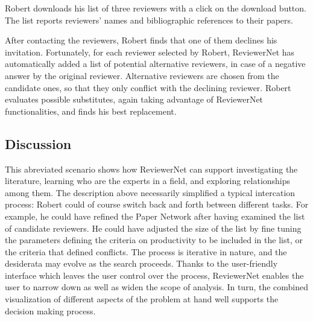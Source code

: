 Robert downloads his list of three reviewers with a click on the download button. The list reports reviewers' names and bibliographic references to their papers. 

After contacting the reviewers, Robert finds that one of them declines his invitation. Fortunately, for each reviewer selected by Robert, ReviewerNet has automatically added a list of potential alternative reviewers, in case of a negative answer by the original reviewer. Alternative reviewers are chosen from the candidate ones, so that they only conflict with the declining reviewer. Robert evaluates possible substitutes, again taking advantage of ReviewerNet functionalities, and finds his best replacement.  

\subsection{Discussion} 

This abreviated scenario shows how ReviewerNet can support investigating the literature, learning who are the experts in a field, and exploring relationships among them. The description above necessarily simplified a typical intercation process: Robert could of course switch back and forth between different tasks. For example, he could have refined the Paper Network after having examined the list of candidate reviewers. He could have adjusted the size of the list by fine tuning the parameters defining the criteria on productivity to be included in the list, or the criteria that defined conflicts. The process is iterative in nature, and the desiderata may evolve as the search proceeds. Thanks to the user-friendly interface which leaves the user control over the process, ReviewerNet enables the user to narrow down as well as widen the scope of analysis. In turn, the combined visualization of different aspects of the problem at hand well supports the decision making process.     

